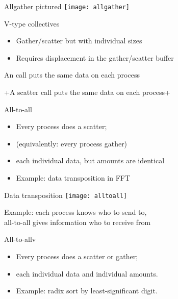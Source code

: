 
\begin{numberedframe}{Allgather pictured}
  \texttt{[image: allgather]}
\end{numberedframe}

\begin{numberedframe}{V-type collectives}
  \begin{itemize}
  \item Gather/scatter but with individual sizes
  \item Requires displacement in the gather/scatter buffer
  \end{itemize}
\end{numberedframe}


\begin{exerciseframe}[scangather]
  
\end{exerciseframe}

\begin{reviewframe}
  An  call puts the same data on each process
  
  \slackpollTF+A scatter call puts the same data on each process+
\end{reviewframe}

\begin{numberedframe}{All-to-all}
  \begin{itemize}
  \item Every process does a scatter;
  \item (equivalently: every process gather)
  \item each individual data, but amounts are identical
  \item Example: data transposition in FFT
  \end{itemize}
\end{numberedframe}

\begin{numberedframe}{Data transposition}
  \texttt{[image: alltoall]}

  Example: each process knows who to send to, \\
  all-to-all gives information who to receive from
\end{numberedframe}

\begin{numberedframe}{All-to-allv}
  \begin{itemize}
  \item Every process does a scatter or gather;
  \item each individual data and individual amounts.
  \item Example: radix sort by least-significant digit.
  \end{itemize}
\end{numberedframe}

